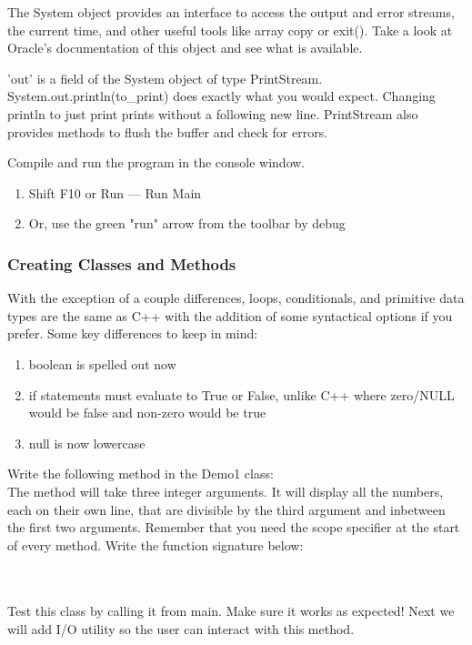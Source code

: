 \documentclass[../../main.tex]{subfiles}
\begin{document}
\begin{steps}
   \item The System object provides an interface to access the output and error streams, the current time, and other useful tools like array copy or exit(). Take a look at Oracle's documentation of this object and see what is available.

   \item 'out' is a field of the System object of type PrintStream. System.out.println(to_print) does exactly what you would expect. Changing println to just print prints without a following new line. PrintStream also provides methods to flush the buffer and check for errors.
   \item Compile and run the program in the console window.
   \begin{enumerate}[label=\Alph*.]
   \item Shift F10 or Run --- Run Main
   \item Or, use the green "run" arrow from the toolbar by debug
   \end{enumerate}
\end{steps}
\subsubsection{Creating Classes and Methods}
   \begin{steps}
      \item With the exception of a couple differences, loops, conditionals, and primitive
         data types are the same as C++ with the addition of some syntactical options if
         you prefer. Some key differences to keep in mind:
   \begin{enumerate}[label=\Alph*.]
      \item boolean is spelled out now
      \item if statements must evaluate to True or False, unlike C++ where zero/NULL
         would be false and non-zero would be true
      \item null is now lowercase
   \end{enumerate}
   \item Write the following method in the Demo1 class: \\
      The method will take three integer arguments. It will display all the numbers, each on 
      their own line, that are divisible by the third argument and inbetween the first two 
      arguments. Remember that you need the scope specifier at the start of every method.
      Write the function signature below: \\
      \vspace{1cm}\\
      \underline{\hspace{15cm}}\\
      \item Test this class by calling it from main. Make sure it works as expected!
         Next we will add I/O utility so the user can interact with this method.
   \end{steps}
\end{document}
